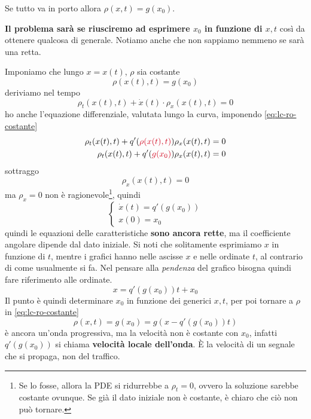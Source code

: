 \documentclass[10pt,a4paper,twoside,openright]{book}
\begin{document}

Se tutto va in porto allora $\rho (x,t) =g(x_{0})$.

\textbf{Il problema sarà se riusciremo ad esprimere $x_{0}$ in funzione di $x,t$} così da ottenere qualcosa di generale. Notiamo anche che non sappiamo nemmeno se sarà una retta.

Imponiamo che lungo $x=x(t)$, $\rho $ sia costante
\begin{equation}
    \rho (x(t) ,t) =g(x_{0})
    \label{eq:lc-ro-costante}
\end{equation}
deriviamo nel tempo
\begin{equation*}
    \rho _{t}(x(t) ,t) +\dot{x}(t) \cdotp \rho _{x}(x(t) ,t) =0
\end{equation*}
ho anche l'equazione differenziale, valutata lungo la curva, imponendo \eqref{eq:lc-ro-costante}
\begin{align*}
    \rho _{t}(x(t) ,t) +q'(\textcolor[rgb]{0.82,0.01,0.11}{\rho (x(t) ,t)}) \rho _{x}(x(t) ,t) & =0 \\
    \rho _{t}(x(t) ,t) +q'(\textcolor[rgb]{0.82,0.01,0.11}{g(x_{0})}) \rho _{x}(x(t) ,t)       & =0
\end{align*}
sottraggo
\begin{equation*}
    [\dot{x}(t) -q'(g(x_{0}))] \rho _{x}(x(t) ,t) =0
\end{equation*}
ma $\rho _{x} =0$ non è ragionevole\footnote{Se lo fosse, allora la PDE si ridurrebbe a $\rho _{t}=0$, ovvero la soluzione sarebbe costante ovunque. Se già il dato iniziale non è costante, è chiaro che ciò non può tornare.}, quindi
\begin{equation*}
    \begin{cases}
        \dot{x}(t) =q'(g(x_{0})) \\
        x(0) =x_{0}
    \end{cases}
\end{equation*}
quindi le equazioni delle caratteristiche \textbf{sono ancora rette}, ma il coefficiente angolare dipende dal dato iniziale. Si noti che solitamente esprimiamo $x$ in funzione di $t$, mentre i grafici hanno nelle ascisse $x$ e nelle ordinate $t$, al contrario di come usualmente si fa. Nel pensare alla \emph{pendenza} del grafico bisogna quindi fare riferimento alle ordinate.
\begin{equation}
    x=q'(g(x_{0})) t+x_{0}
\end{equation}
Il punto è quindi determinare $x_{0}$ in funzione dei generici $x,t$, per poi tornare a $\rho $ in \eqref{eq:lc-ro-costante}
\begin{equation}
    \rho (x,t) =g(x_{0}) =g(x-q'(g(x_{0})) t)
    \label{eq:lc-sol-ro-traffico}
\end{equation}
è ancora un'onda progressiva, ma la velocità non è costante con $x_{0}$, infatti $q'(g(x_{0}))$ si chiama \textbf{velocità locale dell'onda}. È la velocità di un segnale che si propaga, non del traffico.
\end{document}
